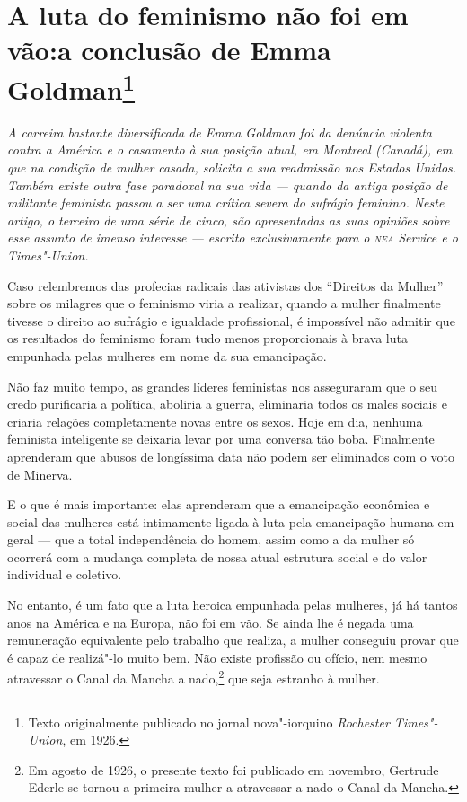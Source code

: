 \chapter[A luta do feminismo não foi em vão]{A luta do feminismo não foi em vão:\break a conclusão de Emma Goldman\footnote{Texto originalmente publicado no
  jornal nova"-iorquino \emph{Rochester Times"-Union}, em 1926.}}

\textit{A carreira bastante diversificada de Emma Goldman foi da
denúncia violenta contra a América e o casamento à sua posição atual, em
Montreal (Canadá), em que na condição de mulher casada, solicita a sua readmissão nos Estados Unidos. Também existe outra fase paradoxal na sua
vida --- quando da antiga posição de militante feminista passou a ser
uma crítica severa do sufrágio feminino. Neste artigo, o terceiro de uma
série de cinco, são apresentadas as suas opiniões sobre esse assunto de
imenso interesse --- escrito exclusivamente para o \emph{\textsc{nea} Service} e o
\emph{Times"-Union.}}

\begin{center}
\end{center}

Caso relembremos das profecias radicais das ativistas dos ``Direitos da
Mulher'' sobre os milagres que o feminismo viria a realizar, quando a
mulher finalmente tivesse o direito ao sufrágio e igualdade
profissional, é impossível não admitir que os resultados do feminismo
foram tudo menos proporcionais à brava luta empunhada pelas mulheres em
nome da sua emancipação.

Não faz muito tempo, as grandes líderes feministas nos asseguraram
que o seu credo purificaria a política, aboliria a guerra, eliminaria
todos os males sociais e criaria relações completamente novas entre os
sexos. Hoje em dia, nenhuma feminista inteligente se deixaria levar por
uma conversa tão boba. Finalmente aprenderam que abusos de longíssima
data não podem ser eliminados com o voto de Minerva.

E o que é mais importante: elas aprenderam que a emancipação econômica e
social das mulheres está intimamente ligada à luta pela emancipação
humana em geral --- que a total independência do homem, assim como a da
mulher só ocorrerá com a mudança completa de nossa atual estrutura
social e do valor individual e coletivo.

No entanto, é um fato que a luta heroica empunhada pelas mulheres, já há
tantos anos na América e na Europa, não foi em vão. Se ainda lhe é
negada uma remuneração equivalente pelo trabalho que realiza, a mulher
conseguiu provar que é capaz de realizá"-lo muito bem. Não existe
profissão ou ofício, nem mesmo atravessar o Canal da Mancha a
nado,\footnote{Em agosto de 1926, o presente texto foi publicado em
  novembro, Gertrude Ederle se tornou a primeira mulher a atravessar a
  nado o Canal da Mancha.} que seja estranho à mulher.


